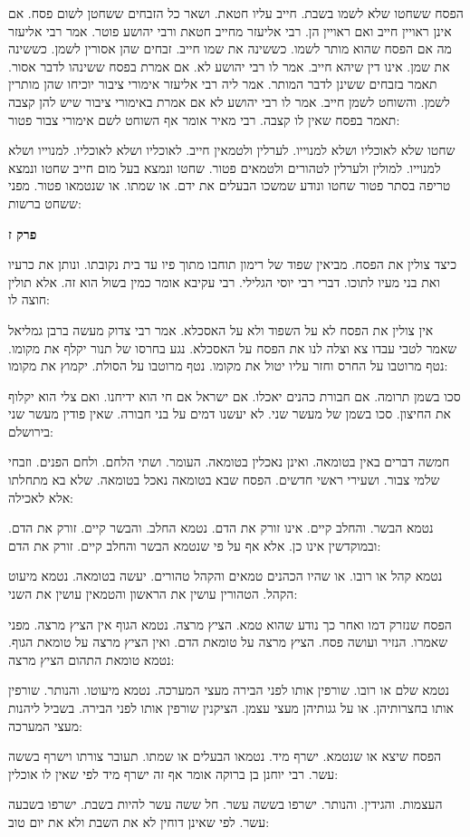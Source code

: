 \documentclass[12pt, openany]{book}
\newcommand{\sethebfont}{
\fontsize{10.5pt}{21.0pt} \selectfont
}
\newcommand{\textblock}[1]{
{\sethebfont #1\\}	
}
\newcommand{\sectname}{}
\newcommand{\newsection}[1]{
	\addcontentsline{toc}{section}{#1}
	\renewcommand{\sectname}{#1}	
	\vspace{-\baselineskip}
	\begin{center}
		\textbf{%
\fontsize{16pt}{16pt}\selectfont
			#1}
	\end{center}
	\vspace{-\baselineskip}
	\nopagebreak
}
\begin{document}
\textblock{הפסח ששחטו שלא לשמו בשבת. חייב עליו חטאת. ושאר כל הזבחים ששחטן לשום פסח. אם אינן ראויין חייב ואם ראויין הן. רבי אליעזר מחייב חטאת ורבי יהושע פוטר. אמר רבי אליעזר מה אם הפסח שהוא מותר לשמו. כששינה את שמו חייב. זבחים שהן אסורין לשמן. כששינה את שמן. אינו דין שיהא חייב. אמר לו רבי יהושע לא. אם אמרת בפסח ששינהו לדבר אסור. תאמר בזבחים ששינן לדבר המותר. אמר ליה רבי אליעזר אימורי ציבור יוכיחו שהן מותרין לשמן. והשוחט לשמן חייב. אמר לו רבי יהושע לא אם אמרת באימורי ציבור שיש להן קצבה תאמר בפסח שאין לו קצבה. רבי מאיר אומר אף השוחט לשם אימורי צבור פטור:  }
\textblock{שחטו שלא לאוכליו ושלא למנוייו. לערלין ולטמאין חייב. לאוכליו ושלא לאוכליו. למנוייו ושלא למנוייו. למולין ולערלין לטהורים ולטמאים פטור. שחטו ונמצא בעל מום חייב שחטו ונמצא טריפה בסתר פטור שחטו ונודע שמשכו הבעלים את ידם. או שמתו. או שנטמאו פטור. מפני ששחט ברשות:  }
\newsection{פרק ז}
\textblock{כיצד צולין את הפסח. מביאין שפוד של רימון תוחבו מתוך פיו עד בית נקובתו. ונותן את כרעיו ואת בני מעיו לתוכו. דברי רבי יוסי הגלילי. רבי עקיבא אומר כמין בשול הוא זה. אלא תולין חוצה לו:  }
\textblock{אין צולין את הפסח לא על השפוד ולא על האסכלא. אמר רבי צדוק מעשה ברבן גמליאל שאמר לטבי עבדו צא וצלה לנו את הפסח על האסכלא. נגע בחרסו של תנור יקלף את מקומו. נטף מרוטבו על החרס וחזר עליו יטול את מקומו. נטף מרוטבו על הסולת. יקמוץ את מקומו:  }
\textblock{סכו בשמן תרומה. אם חבורת כהנים יאכלו. אם ישראל אם חי הוא ידיחנו. ואם צלי הוא יקלוף את החיצון. סכו בשמן של מעשר שני. לא יעשנו דמים על בני חבורה. שאין פודין מעשר שני בירושלם:  }
\textblock{חמשה דברים באין בטומאה. ואינן נאכלין בטומאה. העומר. ושתי הלחם. ולחם הפנים. וזבחי שלמי צבור. ושעירי ראשי חדשים. הפסח שבא בטומאה נאכל בטומאה. שלא בא מתחלתו אלא לאכילה:  }
\textblock{נטמא הבשר. והחלב קיים. אינו זורק את הדם. נטמא החלב. והבשר קיים. זורק את הדם. ובמוקדשין אינו כן. אלא אף על פי שנטמא הבשר והחלב קיים. זורק את הדם:  }
\textblock{נטמא קהל או רובו. או שהיו הכהנים טמאים והקהל טהורים. יעשה בטומאה. נטמא מיעוט הקהל. הטהורין עושין את הראשון והטמאין עושין את השני:  }
\textblock{הפסח שנזרק דמו ואחר כך נודע שהוא טמא. הציץ מרצה. נטמא הגוף אין הציץ מרצה. מפני שאמרו. הנזיר ועושה פסח. הציץ מרצה על טומאת הדם. ואין הציץ מרצה על טומאת הגוף. נטמא טומאת התהום הציץ מרצה:  }
\textblock{נטמא שלם או רובו. שורפין אותו לפני הבירה מעצי המערכה. נטמא מיעוטו. והנותר. שורפין אותו בחצרותיהן. או על גגותיהן מעצי עצמן. הציקנין שורפין אותו לפני הבירה. בשביל ליהנות מעצי המערכה:  }
\textblock{הפסח שיצא או שנטמא. ישרף מיד. נטמאו הבעלים או שמתו. תעובר צורתו וישרף בששה עשר. רבי יוחנן בן ברוקה אומר אף זה ישרף מיד לפי שאין לו אוכלין:  }
\textblock{העצמות. והגידין. והנותר. ישרפו בששה עשר. חל ששה עשר להיות בשבת. ישרפו בשבעה עשר. לפי שאינן דוחין לא את השבת ולא את יום טוב:  }
\end{document}
